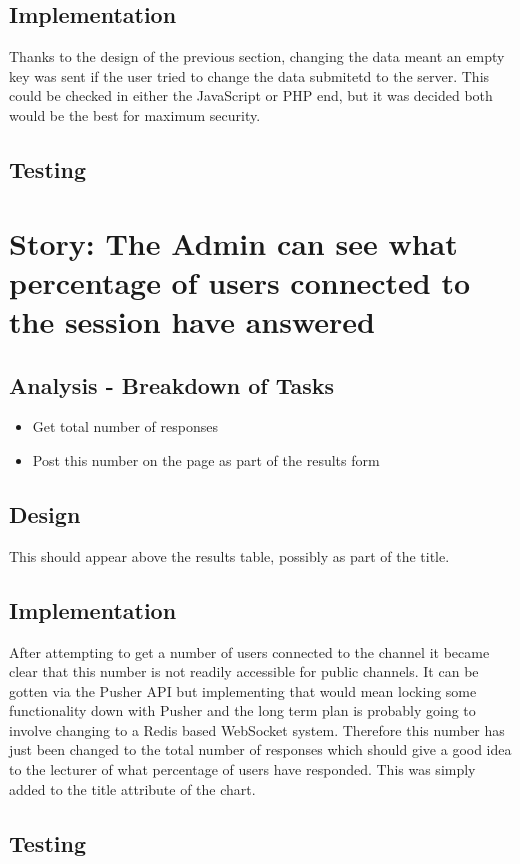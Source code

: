 \documentclass{article}
\begin{document}
\subsection{Implementation}
Thanks to the design of the previous section, changing the data meant an empty key was sent if the user tried to change the data submitetd to the server. This could be checked in either the JavaScript or PHP end, but it was decided both would be the best for maximum security. 
\subsection{Testing}
\newpage

\section{Story: The Admin can see what percentage of users connected to the session have answered}
\subsection{Analysis - Breakdown of Tasks}
\begin{itemize}
	\item Get total number of responses
	\item Post this number on the page as part of the results form
\end{itemize}
\subsection{Design}
This should appear above the results table, possibly as part of the title.
\subsection{Implementation}
After attempting to get a number of users connected to the channel it became clear that this number is not readily accessible for public channels. It can be gotten via the Pusher API but implementing that would mean locking some functionality down with Pusher and the long term plan is probably going to involve changing to a Redis based WebSocket system. Therefore this number has just been changed to the total number of responses which should give a good idea to the lecturer of what percentage of users have responded. This was simply added to the title attribute of the chart.
\subsection{Testing}
\newpage

%
%
\end{document}
